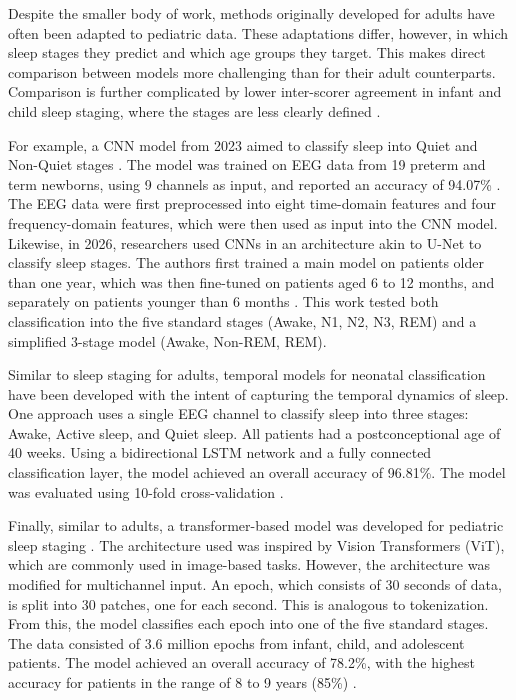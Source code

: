 Despite the smaller body of work, methods originally developed for adults have often been adapted to
pediatric data. These adaptations differ, however, in which sleep stages they predict and which age groups
they target. This makes direct comparison between models more challenging than for their adult counterparts.
Comparison is further complicated by lower inter-scorer agreement in infant and child sleep staging, where the
stages are less clearly defined \cite{Tripathi2026PediatricSleepNet}.

For example, a CNN model from 2023 aimed to classify sleep 
into Quiet and Non-Quiet stages \cite{neonatalcnn2023}.
The model was trained on EEG data from 19 preterm and term newborns,
using 9 channels as input, and reported an accuracy of 94.07\% \cite{neonatalcnn2023}.
The EEG data were first preprocessed into eight time-domain features and 
four frequency-domain features, which were then used as input into the CNN model.
Likewise, in 2026, researchers used CNNs in an architecture akin to U-Net to 
classify sleep stages. The authors first trained a main model on patients 
older than one year, which was then fine-tuned on patients aged 6 to 12 months,
and separately on patients younger than 6 months \cite{Tripathi2026PediatricSleepNet}.
This work tested both classification into the five standard stages (Awake, N1, N2, N3, REM) 
and a simplified 3-stage model (Awake, Non-REM, REM).

Similar to sleep staging for adults, temporal models for neonatal
classification have been developed with the intent of capturing the temporal dynamics of sleep.
One approach \cite{neonetalLstm} uses a single EEG channel to classify sleep into
three stages: Awake, Active sleep, and Quiet sleep.
All patients had a postconceptional age of 40 weeks. Using a bidirectional LSTM network
and a fully connected classification layer, the model achieved an overall accuracy of
96.81\%. The model was evaluated using 10-fold cross-validation \cite{neonetalLstm}.

Finally, similar to adults, a transformer-based model was developed
for pediatric sleep staging \cite{transformerinfant2022}.
The architecture used was inspired by Vision Transformers (ViT), which are commonly 
used in image-based tasks. However, the architecture was 
modified for multichannel input. An epoch, which consists of 30 seconds of data,
is split into 30 patches, one for each second. This is analogous to tokenization.
From this, the model classifies each epoch into one of the five standard stages.
The data consisted of 3.6 million epochs from infant, child, and adolescent patients.
The model achieved an overall accuracy of 78.2\%, with 
the highest accuracy for patients in the range of 8 to 9 years (85\%) \cite{transformerinfant2022}.